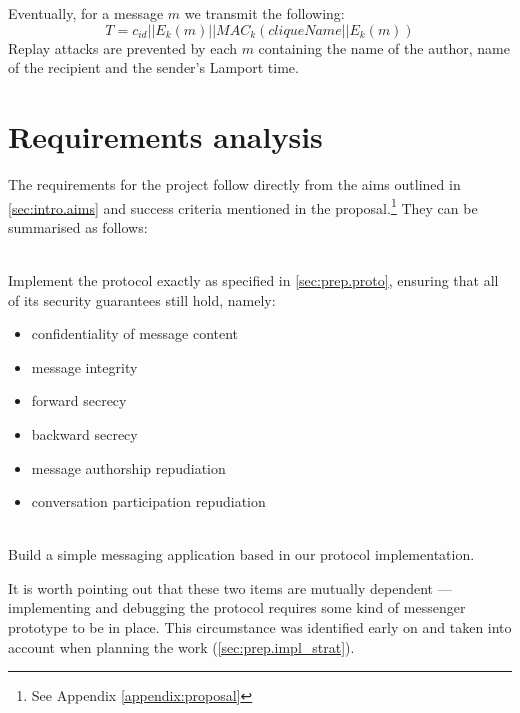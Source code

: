 \documentclass[a4paper, 12pt]{report}
\begin{document}
Eventually, for a message $m$ we transmit the following:
\begin{equation*}
    T = c_{id} || E_k(m) || MAC_k(cliqueName || E_k(m))
\end{equation*}
Replay attacks are prevented by each $m$ containing the name of the author, name of the recipient and the sender's Lamport time.

\section{Requirements analysis}
\label{sec:prep.requirements}
The requirements for the project follow directly from the aims outlined in \cref{sec:intro.aims} and success criteria mentioned in the proposal.\footnote{See Appendix \ref{appendix:proposal}} They can be summarised as follows:
\begin{description}[labelindent=0.5cm, leftmargin=1.3cm, rightmargin=0.5cm, topsep=2pt]
    \item[Implementing the protocol] \hfill \\
        Implement the protocol exactly as specified in \cref{sec:prep.proto}, ensuring that all of its security guarantees still hold, namely:
        \begin{itemize}[topsep=1pt, itemsep=2pt]
            \item confidentiality of message content
            \item message integrity
            \item forward secrecy
            \item backward secrecy
            \item message authorship repudiation
            \item conversation participation repudiation
        \end{itemize}


    \item[Constructing a useable messaging application] \hfill \\
        Build a simple messaging application based in our protocol implementation.    
\end{description}
\vspace{2pt}
It is worth pointing out that these two items are mutually dependent --- implementing and debugging the protocol requires some kind of messenger prototype to be in place. This circumstance was identified early on and taken into account when planning the work (\cref{sec:prep.impl_strat}). \\
\end{document}
